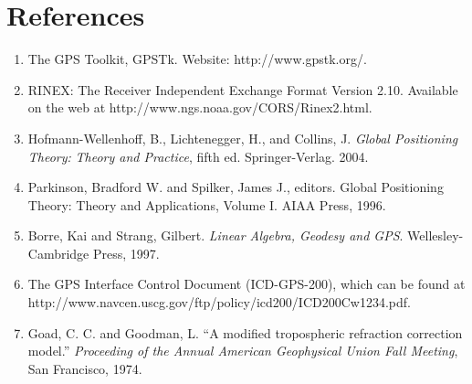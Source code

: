 \section{References}

\begin{enumerate}
  \item The GPS Toolkit, GPSTk. Website: http://www.gpstk.org/.
  
  \item RINEX: The Receiver Independent Exchange Format Version 2.10.
  Available on the web at http://www.ngs.noaa.gov/CORS/Rinex2.html.
  
  \item Hofmann-Wellenhoff, B., Lichtenegger, H., and Collins, J.
  \textit{Global Positioning Theory:} \textit{Theory and Practice}, fifth ed.
  Springer-Verlag. 2004.
  
  \item Parkinson, Bradford W. and Spilker, James J., editors. Global
  Positioning Theory: Theory and Applications, Volume I. AIAA Press, 1996.
  
  \item Borre, Kai and Strang, Gilbert. \textit{Linear Algebra, Geodesy and
  GPS}. Wellesley-Cambridge Press, 1997.
  
  \item The GPS Interface Control Document (ICD-GPS-200), which can be found
  at http://www.navcen.uscg.gov/ftp/policy/icd200/ICD200Cw1234.pdf.
  
  \item Goad, C. C. and Goodman, L. ``A modified tropospheric refraction
  correction model.'' \textit{Proceeding of the Annual American Geophysical
  Union Fall Meeting}, San Francisco, 1974.
\end{enumerate}

